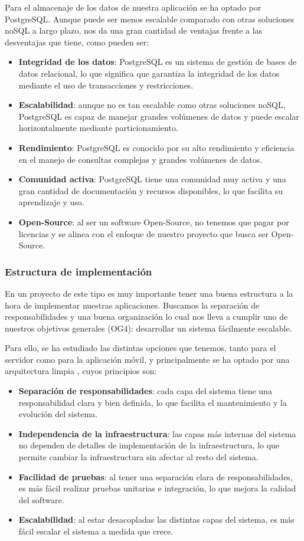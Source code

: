 Para el almacenaje de los datos de nuestra aplicación se ha optado por PostgreSQL.
Aunque puede ser menos escalable comparado con otras soluciones noSQL a largo plazo, nos da una gran cantidad de ventajas frente a las desventajas que tiene, como pueden ser:
\begin{itemize}
    \item \textbf{Integridad de los datos}: PostgreSQL es un sistema de gestión de bases de datos relacional, lo que significa que garantiza la integridad de los datos mediante el uso de transacciones y restricciones.
    \item \textbf{Escalabilidad}: aunque no es tan escalable como otras soluciones noSQL, PostgreSQL es capaz de manejar grandes volúmenes de datos y puede escalar horizontalmente mediante particionamiento.
    \item \textbf{Rendimiento}: PostgreSQL es conocido por su alto rendimiento y eficiencia en el manejo de consultas complejas y grandes volúmenes de datos.
    \item \textbf{Comunidad activa}: PostgreSQL tiene una comunidad muy activa y una gran cantidad de documentación y recursos disponibles, lo que facilita su aprendizaje y uso.
    \item \textbf{Open-Source}: al ser un software Open-Source, no tenemos que pagar por licencias y se alinea con el enfoque de nuestro proyecto que busca ser Open-Source.
\end{itemize}

\subsubsection{Estructura de implementación}
En un proyecto de este tipo es muy importante tener una buena estructura a la hora de implementar nuestras aplicaciones.
Buscamos la separación de responsabilidades y una buena organización lo cual nos lleva a cumplir uno de nuestros objetivos generales (OG4): desarrollar un sistema fácilmente escalable.

Para ello, se ha estudiado las distintas opciones que tenemos, tanto para el servidor como para la aplicación móvil, y principalmente se ha optado por una arquitectura limpia \parencite{uncle-bob-clean-architecture}, cuyos principios son:
\begin{itemize}
    \item \textbf{Separación de responsabilidades}: cada capa del sistema tiene una responsabilidad clara y bien definida, lo que facilita el mantenimiento y la evolución del sistema.
    \item \textbf{Independencia de la infraestructura}: las capas más internas del sistema no dependen de detalles de implementación de la infraestructura, lo que permite cambiar la infraestructura sin afectar al resto del sistema.
    \item \textbf{Facilidad de pruebas}: al tener una separación clara de responsabilidades, es más fácil realizar pruebas unitarias e integración, lo que mejora la calidad del software.
    \item \textbf{Escalabilidad}: al estar desacopladas las distintas capas del sistema, es más fácil escalar el sistema a medida que crece.
\end{itemize}

